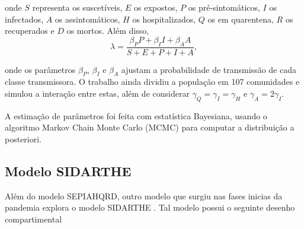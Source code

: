 \documentclass{article}
\begin{document}
\noindent onde $S$ representa os suscetíveis, $E$ os expostos, $P$ os pré-sintomáticos, $I$ os infectados, $A$ os assintomáticos, $H$ os hospitalizados, $Q$ os em quarentena, $R$ os recuperados e $D$ os mortos. Além disso, 
\[\lambda = \frac{\beta_P P + \beta_I I + \beta_A A}{S+E+P+I+A},\]

\noindent onde os parâmetros $\beta_P$, $\beta_I$ e $\beta_A$ ajustam a probabilidade de transmissão de cada classe transmissora. O trabalho ainda dividiu a população em 107 comunidades e simulou a interação entre estas, além de considerar $\gamma_Q = \gamma_I = \gamma_H$ e $\gamma_A = 2\gamma_I$.

A estimação de parâmetros foi feita com estatística Bayesiana, usando o algoritmo Markov Chain Monte Carlo (MCMC) para computar a distribuição a posteriori.

\subsection{Modelo SIDARTHE}

Além do modelo SEPIAHQRD, outro modelo que surgiu nas fases inicias da pandemia explora o modelo SIDARTHE \cite{JOUR}. Tal modelo possui o seguinte desenho compartimental
\end{document}
